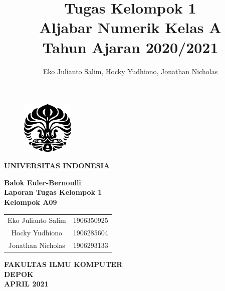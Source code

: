 \documentclass[10pt, a4paper, onecolumn, oneside, final]{report}
\title{Tugas Kelompok 1\\Aljabar Numerik Kelas A\\Tahun Ajaran 2020/2021}
\author{Eko Julianto Salim, Hocky Yudhiono, Jonathan Nicholas}
\begin{document}
\begin{titlepage}
    \begin{center}\begin{figure}
            \begin{center}
                \includegraphics[width=2.5cm]{makara.eps}
            \end{center}
        \end{figure}    
        \vspace*{0cm}
        \textbf{
        	UNIVERSITAS INDONESIA\\
        }
        
        \vspace*{1.0cm}
        \textbf{Balok Euler-Bernoulli} \\[1.0cm]

        \vspace*{2.5 cm}    
        \textbf{Laporan Tugas Kelompok 1} \\
        
        \vspace*{3 cm}
        \textbf{Kelompok A09} \\
        
\begin{table}[H]
        \centering
        \begin{tabular}{c c}
            Eko Julianto Salim & 1906350925\\
            Hocky Yudhiono & 1906285604 \\
            Jonathan Nicholas & 1906293133\\
        \end{tabular}
        \end{table}
        \vspace*{5.0cm}

        \textbf{
        	FAKULTAS ILMU KOMPUTER\\
        	DEPOK \\
        	APRIL 2021
        }
    \end{center}
\end{titlepage}
\end{document}
